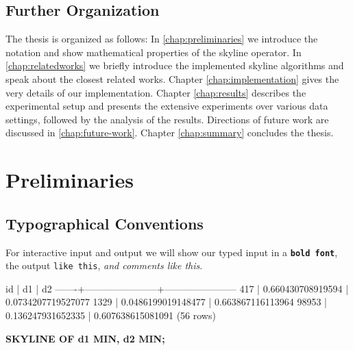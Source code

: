 \section{Further Organization}
The thesis is organized as follows: In \autoref{chap:preliminaries} we
introduce the notation and show mathematical properties of the skyline
operator.  In \autoref{chap:relatedworks} we briefly introduce the
implemented skyline algorithms and speak about the closest related
works. Chapter \ref{chap:implementation} gives the very details of our
implementation. Chapter \ref{chap:results} describes the experimental setup
and presents the extensive experiments over various data settings,
followed by the analysis of the results. Directions of future work are
discussed in \autoref{chap:future-work}. Chapter \ref{chap:summary}
concludes the thesis.






\chapter{Preliminaries}
\label{chap:preliminaries}



\section{Typographical Conventions}
For interactive input and output we will show our typed input in a \texttt{\bfseries bold font}, the output \texttt{like this}, \textit{and comments like this}.



\begin{interactive}
  id   |          d1           |          d2
-------+-----------------------+-----------------------
   417 |     0.660430708919594 |    0.0734207719527077
  1329 |    0.0486199019148477 |     0.663867116113964
\ellipsis{}
 98953 |     0.136247931652335 |     0.607638615081091
(56 rows)

 \prebreak {}
   \postbreak \textbf{SKYLINE OF d1 MIN, d2 MIN;}
\ellipsis{}

\shprompt{}
\end{interactive}

